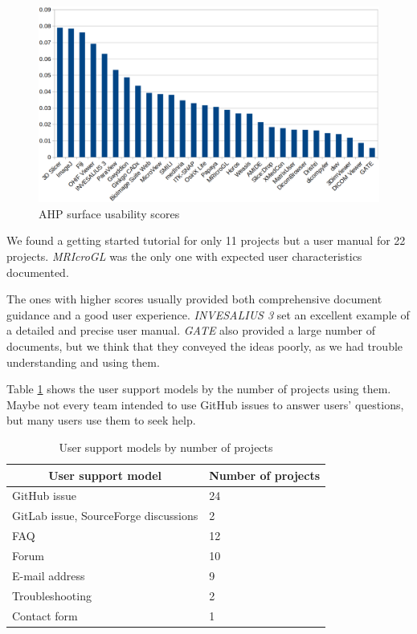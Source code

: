 \begin{figure}[H]
\includegraphics[scale=0.38]{figures/usability_scores.png}
\caption{AHP surface usability scores}
\label{fg_usability_scores}
\end{figure}

We found a getting started tutorial for only 11 projects but a user manual for 22 projects. \textit{MRIcroGL} was the only one with expected user characteristics documented.

The ones with higher scores usually provided both comprehensive document guidance and a good user experience. \textit{INVESALIUS 3} set an excellent example of a detailed and precise user manual. \textit{GATE} also provided a large number of documents, but we think that they conveyed the ideas poorly, as we had trouble understanding and using them.
 
Table \ref{tab_user_support_model} shows the user support models by the number of projects using them. Maybe not every team intended to use GitHub issues to answer users' questions, but many users use them to seek help.

\begin{table}[H]
\centering
\begin{tabular}{ll}
\hline
\multicolumn{1}{c}{User support model} & Number of projects \\ \hline
GitHub issue & 24 \\
GitLab issue, SourceForge discussions & 2 \\
FAQ & 12 \\
Forum & 10 \\
E-mail address & 9 \\
Troubleshooting & 2 \\
Contact form & 1 \\ \hline
\end{tabular}
\caption{\label{tab_user_support_model}User support models by number of projects}
\end{table}

